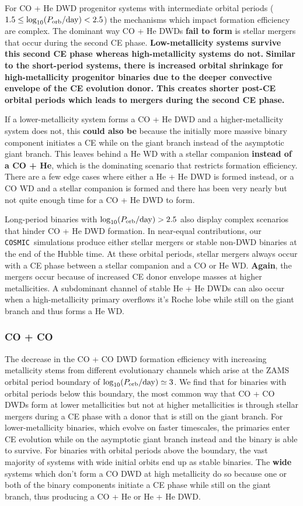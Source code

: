 \documentclass[twocolumn, linenumbers]{aastex631}
\newcommand{\cosmic}{\texttt{COSMIC}}
\begin{document}
For CO + He DWD progenitor systems with intermediate orbital periods ($1.5\leq \log_{10}(P_{\rm{orb}}/\rm{day})< 2.5$) the mechanisms which impact formation efficiency are complex. The dominant way CO + He DWDs \textbf{fail to form} is stellar mergers that occur during the second CE phase. \textbf{Low-metallicity systems survive this second CE phase whereas high-metallicity systems do not.} \textbf{Similar to the short-period systems, there is increased orbital shrinkage for high-metallicity progenitor binaries due to the deeper convective envelope of the CE evolution donor. This creates shorter post-CE orbital periods which leads to mergers during the second \textbf{CE} phase.}

If a lower-metallicity system forms a CO + He DWD and a higher-metallicity system does not, this \textbf{could also be} because the initially more massive binary component initiates a CE while on the giant branch instead of the asymptotic giant branch. This leaves behind a He WD with a stellar companion \textbf{instead of a CO + He}, which is the dominating scenario that restricts formation efficiency. There are a few edge cases where either a He + He DWD is formed instead, or a CO WD and a stellar companion is formed and there has been very nearly but not quite enough time for a CO + He DWD to form. 

Long-period binaries with $\log_{10}(P_{\rm{orb}}/\rm{day})>2.5$ also display complex scenarios that hinder CO + He DWD formation. In near-equal contributions, our \cosmic\ simulations produce either stellar mergers or stable non-DWD binaries at the end of the Hubble time. At these orbital periods, stellar mergers always occur with a CE phase between a stellar companion and a CO or He WD. \textbf{Again}, the mergers occur because of increased CE donor envelope masses at higher metallicities. A subdominant channel of stable He + He DWDs can also occur when a high-metallicity primary overflows it's Roche lobe while still on the giant branch and thus forms a He WD.

\subsubsection{\textbf{CO + CO}}\label{formeff_COCO}
The decrease in the CO + CO DWD formation efficiency with increasing metallicity stems from different evolutionary channels which arise at the ZAMS orbital period boundary of $\log_{10}(P_{\rm{orb}}/\rm{day})\simeq3$. We find that for binaries with orbital periods below this boundary, the most common way that CO + CO DWDs form at lower metallicities but not at higher metallicities is through stellar mergers during a CE phase with a donor that is still on the giant branch. For lower-metallicity binaries, which evolve on faster timescales, the primaries enter CE evolution while on the asymptotic giant branch instead and the binary is able to survive. For binaries with orbital periods above the boundary, the vast majority of systems with wide initial orbits end up as stable binaries. The \textbf{wide} systems which don’t form a CO DWD at high metallicity do so because one or both of the binary components initiate a CE phase while still on the giant branch, thus producing a CO + He or He + He DWD. 
\end{document}
